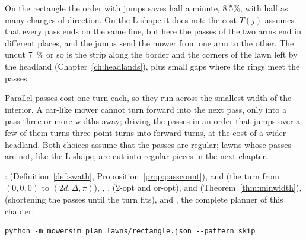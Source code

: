 On the rectangle the order with jumps saves half a minute, 8.5\%, with half
as many changes of direction. On the L-shape it does not: the cost $T(j)$
assumes that every pass ends on the same line, but here the passes of the
two arms end in different places, and the jumps send the mower from one
arm to the other. The uncut \SI{7}{\percent} or so is the strip along the
border and the corners of the lawn left by the headland
(Chapter~\ref{ch:headlands}), plus small gaps where the rings meet the
passes.

\begin{inwords}
  Parallel passes cost one turn each, so they run across the smallest width
  of the interior. A car-like mower cannot turn forward into the next pass,
  only into a pass three or more widths away; driving the passes in an order
  that jumps over a few of them turns three-point turns into forward turns,
  at the cost of a wider headland. Both choices assume that the passes are
  regular; lawns whose passes are not, like the L-shape, are cut into
  regular pieces in the next chapter.
\end{inwords}

\begin{incode}
  : 
  (Definition~\ref{def:swath}, Proposition~\ref{prop:passcount}),
   and  (the turn from $(0, 0, 0)$ to
  $(2d, \Delta, \pi)$), , ,
   (2-opt and or-opt), 
  and  (Theorem~\ref{thm:minwidth}), 
  (shortening the passes until the turn fits),  and
  , the complete planner of this chapter:
  \begin{verbatim}
python -m mowersim plan lawns/rectangle.json --pattern skip
  \end{verbatim}
\end{incode}
